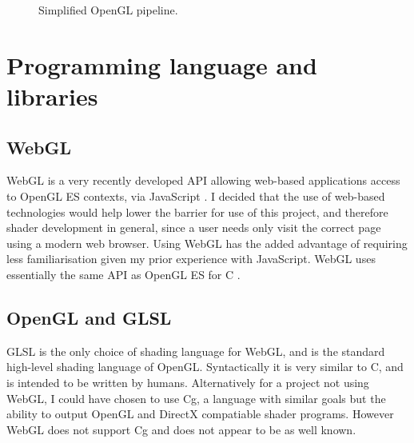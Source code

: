 \documentclass[12pt,twoside,notitlepage]{report}
\begin{document}
\begin{figure}
\centering
{}
\caption{Simplified OpenGL pipeline.\label{opengl-pipe}}
\end{figure}

\section{Programming language and libraries}

\subsection*{WebGL}
WebGL is a very recently developed API allowing web-based applications access to OpenGL ES contexts, via JavaScript \citet{webgl-spec}. I decided that the use of web-based technologies would help lower the barrier for use of this project, and therefore shader development in general, since a user needs only visit the correct page using a modern web browser. Using WebGL has the added advantage of requiring less familiarisation given my prior experience with JavaScript. WebGL uses essentially the same API as OpenGL ES for C \citet{webgl-spec}.

\subsection*{OpenGL and GLSL}
GLSL is the only choice of shading language for WebGL, and is the standard high-level shading language of OpenGL. Syntactically it is very similar to C, and is intended to be written by humans. Alternatively for a project not using WebGL, I could have chosen to use Cg, a language with similar goals but the ability to output OpenGL and DirectX compatiable shader programs. However WebGL does not support Cg and does not appear to be as well known. 
\end{document}
